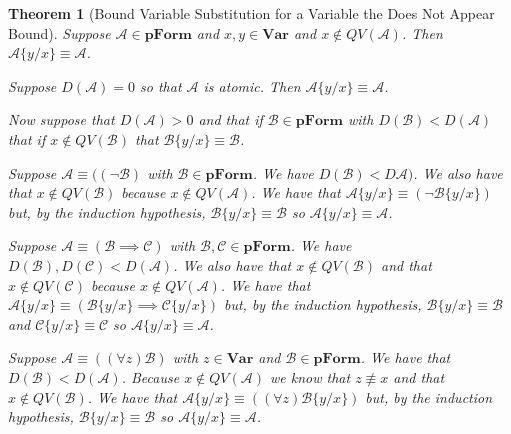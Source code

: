 \documentclass[12pt]{article}
\theoremstyle{break}
\theoremstyle{break}
\newtheorem{theorem}{Theorem}[section]
\theoremstyle{break}
\theoremstyle{break}
\theoremstyle{break}
\newtheorem{informal definition}[definition]{Informal Definition}
\newcommand{\mc}[1]{\mathcal{#1}}
\begin{document}
\begin{theorem}[Bound Variable Substitution for a Variable the Does Not Appear Bound]
\label{thm:bndvarsubforvarnotappear}
Suppose $\mc{A}\in\textbf{pForm}$ and $x, y \in \textbf{Var}$ and $x\not \in QV(\mc{A})$. Then $\mc{A}\{y/x\}\equiv \mc{A}$.

Suppose $D(\mc{A}) = 0$ so that $\mc{A}$ is atomic.
Then $\mc{A}\{y/x\} \equiv \mc{A}$.

Now suppose that $D(\mc{A}) > 0$ and that if $\mc{B}\in\textbf{pForm}$ with $D(\mc{B}) < D(\mc{A})$ that if $x\not \in QV(\mc{B})$ that $\mc{B}\{y/x\} \equiv \mc{B}$.

Suppose $\mc{A} \equiv ((\lnot \mc{B})$ with $\mc{B}\in\textbf{pForm}$.
We have $D(\mc{B}) < D\mc{A})$.
We also have that $x\not \in QV(\mc{B})$ because $x\not \in QV(\mc{A})$.
We have that $\mc{A}\{y/x\} \equiv (\lnot \mc{B}\{y/x\})$ but, by the induction hypothesis, $\mc{B}\{y/x\} \equiv \mc{B}$ so $\mc{A}\{y/x\}\equiv \mc{A}$.

Suppose $\mc{A} \equiv (\mc{B}\implies \mc{C})$ with $\mc{B}, \mc{C} \in \textbf{pForm}$.
We have $D(\mc{B}), D(\mc{C}) < D(\mc{A})$.
We also have that $x\not \in QV(\mc{B})$ and that $x\not \in QV(\mc{C})$ because $x\not \in QV(\mc{A})$.
We have that $\mc{A}\{y/x\} \equiv (\mc{B}\{y/x\} \implies \mc{C}\{y/x\})$ but, by the induction hypothesis, $\mc{B}\{y/x\} \equiv \mc{B}$ and $\mc{C}\{y/x\}\equiv \mc{C}$ so $\mc{A}\{y/x\} \equiv \mc{A}$.

Suppose $\mc{A}\equiv ((\forall z) \mc{B})$ with $z\in\textbf{Var}$ and $\mc{B}\in\textbf{pForm}$.
We have that $D(\mc{B}) < D(\mc{A})$.
Because $x\not \in QV(\mc{A})$ we know that $z\not \equiv x$ and that $x\not \in QV(\mc{B})$.
We have that $\mc{A}\{y/x\} \equiv ((\forall z)\mc{B}\{y/x\})$ but, by the induction hypothesis, $\mc{B}\{y/x\} \equiv \mc{B}$ so $\mc{A}\{y/x\} \equiv \mc{A}$.
\end{theorem}
\end{document}
